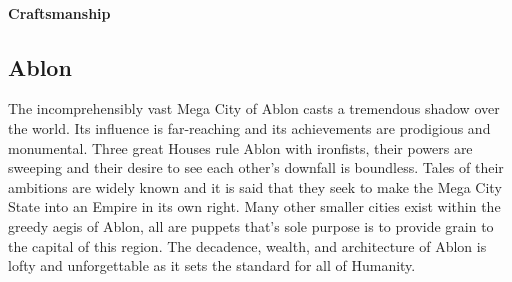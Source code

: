 \begin{multicols}{2}
\paragraph{Craftsmanship} 


%
%
%
%
%

        

\subsection{Ablon} 

The incomprehensibly vast Mega City of Ablon casts a tremendous shadow over the world. Its influence is far-reaching and its achievements are prodigious and monumental. Three great Houses rule Ablon with ironfists, their powers are sweeping and their desire to see each other's downfall is boundless. Tales of their ambitions are widely known and it is said that they seek to make the Mega City State into an Empire in its own right. Many other smaller cities exist within the greedy aegis of Ablon, all are puppets that's sole purpose is to provide grain to the capital of this region. The decadence, wealth, and architecture of Ablon is lofty and unforgettable as it sets the standard for all of Humanity.  


\end{multicols}
